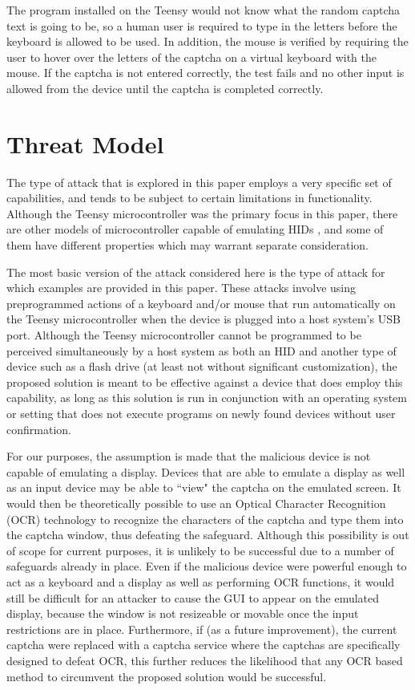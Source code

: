 \documentclass[pagenumbers]{ieee}
\begin{document}
The program installed on the Teensy would not know what the random captcha text is going to be, so a human user is required to type in the letters before the keyboard is allowed to be used. In addition, the mouse is verified by requiring the user to hover over the letters of the captcha on a virtual keyboard with the mouse. If the captcha is not entered correctly, the test fails and no other input is allowed from the device until the captcha is completed correctly.


\section{Threat Model}
\label{section:threat}

The type of attack that is explored in this paper employs a very specific set of capabilities, and tends to be subject to certain limitations in functionality. Although the Teensy microcontroller was the primary focus in this paper, there are other models of microcontroller capable of emulating HIDs  \cite{captcha}, and some of them have different properties which may warrant separate consideration. 

The most basic version of the attack considered here is the type of attack for which examples are provided in this paper. These attacks involve using preprogrammed actions of a keyboard and/or mouse that run automatically on the Teensy microcontroller when the device is plugged into a host system's USB port. Although the Teensy microcontroller cannot be programmed to be perceived simultaneously by a host system as both an HID and another type of device such as a flash drive (at least not without significant customization), the proposed solution is meant to be effective against a device that does employ this capability, as long as this solution is run in conjunction with an operating system or setting that does not execute programs on newly found devices without user confirmation.

For our purposes, the assumption is made that the malicious device is not capable of emulating a display. Devices that are able to emulate a display as well as an input device may be able to ``view" the captcha on the emulated screen. It would then be theoretically possible to use an Optical Character Recognition (OCR) technology to recognize the characters of the captcha and type them into the captcha window, thus defeating the safeguard. Although this possibility is out of scope for current purposes, it is unlikely to be successful due to a number of safeguards already in place. Even if the malicious device were powerful enough to act as a keyboard and a display as well as performing OCR functions,  it would still be difficult for an attacker to cause the GUI to appear on the emulated display, because the window is not resizeable or movable once the input restrictions are in place. Furthermore, if (as a future improvement), the current captcha were replaced with a captcha service where the captchas are specifically designed to defeat OCR, this further reduces the likelihood that any OCR based method to circumvent the proposed solution would be successful.
\end{document}

